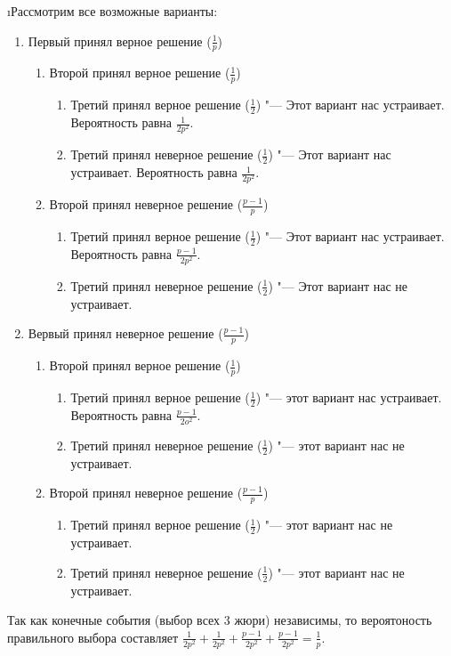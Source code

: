 \i Рассмотрим все возможные варианты:
\begin{enumerate}
    \item Первый принял верное решение ($\frac{1}{p}$)
    \begin{enumerate}
        \item Второй принял верное решение ($\frac{1}{p}$)
        \begin{enumerate}
            \item Третий принял верное решение ($\frac{1}{2}$) "--- Этот вариант нас устраивает. Вероятность равна $\frac{1}{2p^2}$.
            \item Третий принял неверное решение ($\frac{1}{2}$) "--- Этот вариант нас устраивает. Вероятность равна $\frac{1}{2p^2}$.
        \end{enumerate}
        \item Второй принял неверное решение ($\frac{p - 1}{p}$)
        \begin{enumerate}
            \item Третий принял верное решение ($\frac{1}{2}$) "--- Этот вариант нас устраивает. Вероятность равна $\frac{p-1}{2p^2}$.
            \item Третий принял неверное решение ($\frac{1}{2}$) "--- Этот вариант нас не устраивает.
        \end{enumerate}
    \end{enumerate}
    \item Вервый принял неверное решение ($\frac{p - 1}{p}$)
    \begin{enumerate}
        \item Второй принял верное решение ($\frac{1}{p}$)
        \begin{enumerate}
            \item Третий принял верное решение ($\frac{1}{2}$) "--- этот вариант нас устраивает. Вероятность равна $\frac{p-1}{2o^2}$.
            \item Третий принял неверное решение ($\frac{1}{2}$) "--- этот вариант нас не устраивает.
        \end{enumerate}
        \item Второй принял неверное решение ($\frac{p - 1}{p}$)
        \begin{enumerate}
            \item Третий принял верное решение ($\frac{1}{2}$)  "--- этот вариант нас не устраивает.
            \item Третий принял неверное решение ($\frac{1}{2}$)  "--- этот вариант нас не устраивает.
        \end{enumerate}
    \end{enumerate}
\end{enumerate}
Так как конечные события (выбор всех 3 жюри) независимы, то вероятоность правильного выбора составляет $\frac{1}{2p^2} + \frac{1}{2p^2} + \frac{p-1}{2p^2} + \frac{p-1}{2p^2} = \frac{1}{p}$.

